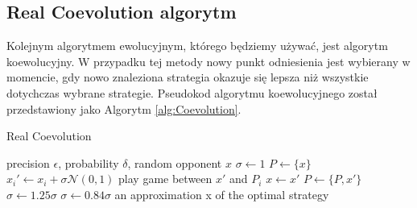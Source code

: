 \documentclass[inzynierska]{pwr_wmat_praca_dyplomowa}
\theoremstyle{plain}
\numberwithin{theorem}{chapter}
\theoremstyle{definition}
\numberwithin{theorem}{chapter}
\begin{document}
	\subsection{Real Coevolution algorytm}	
	Kolejnym algorytmem ewolucyjnym, którego będziemy używać, jest algorytm koewolucyjny. W przypadku tej metody nowy punkt odniesienia jest wybierany w momencie, gdy nowo znaleziona strategia okazuje się lepsza niż wszystkie dotychczas wybrane strategie. Pseudokod algorytmu koewolucyjnego został przedstawiony jako Algorytm \ref{alg:Coevolution}. 
	\begin{algorithm}\captionsetup{labelformat=custom2}
		\caption{Real Coevolution}\label{alg:Coevolution}
		\begin{algorithmic}
			\Ensure  precision $\epsilon$, probability $\delta$, random opponent $x$
			\State $\sigma \gets 1 $ 
			\State $P \gets \{ x \}$ 
			\State $x_i' \gets x_i + \sigma \mathcal{N}(0,1)$ 
			\EndFor
			\Repeat
			\State play game between $x'$ and $P_i$
			\EndFor
			\State $x \gets x'$
			\State $P \gets \{P,x'\}$
			\State $\sigma \gets 1.25\sigma$
			\Else
			\State $\sigma \gets 0.84 \sigma$
			\EndIf
			\EndWhile
			\State \Return an approximation x of the optimal strategy
		\end{algorithmic}
	\end{algorithm}
\end{document}
